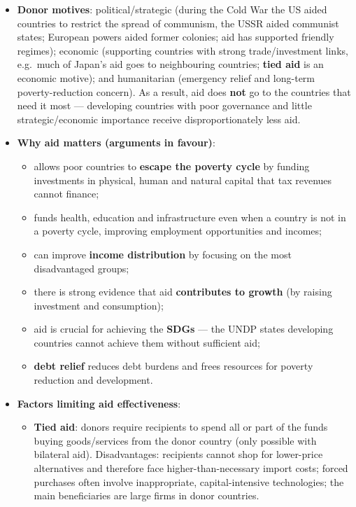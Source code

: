 \begin{itemize}
\begin{itemize}
  \end{itemize}
  \item \textbf{Donor motives}: political/strategic (during the Cold War the US aided countries to restrict the spread of communism, the USSR aided communist states; European powers aided former colonies; aid has supported friendly regimes); economic (supporting countries with strong trade/investment links, e.g.\ much of Japan's aid goes to neighbouring countries; \textbf{tied aid} is an economic motive); and humanitarian (emergency relief and long-term poverty-reduction concern). As a result, aid does \textbf{not} go to the countries that need it most --- developing countries with poor governance and little strategic/economic importance receive disproportionately less aid.
  \item \textbf{Why aid matters (arguments in favour)}:
  \begin{itemize}
    \item allows poor countries to \textbf{escape the poverty cycle} by funding investments in physical, human and natural capital that tax revenues cannot finance;
    \item funds health, education and infrastructure even when a country is not in a poverty cycle, improving employment opportunities and incomes;
    \item can improve \textbf{income distribution} by focusing on the most disadvantaged groups;
    \item there is strong evidence that aid \textbf{contributes to growth} (by raising investment and consumption);
    \item aid is crucial for achieving the \textbf{SDGs} --- the UNDP states developing countries cannot achieve them without sufficient aid;
    \item \textbf{debt relief} reduces debt burdens and frees resources for poverty reduction and development.
  \end{itemize}
  \item \textbf{Factors limiting aid effectiveness}:
  \begin{itemize}
    \item \textbf{Tied aid}: donors require recipients to spend all or part of the funds buying goods/services from the donor country (only possible with bilateral aid). Disadvantages: recipients cannot shop for lower-price alternatives and therefore face higher-than-necessary import costs; forced purchases often involve inappropriate, capital-intensive technologies; the main beneficiaries are large firms in donor countries.

\end{itemize}
\end{itemize}
